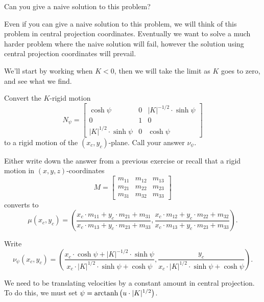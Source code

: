 \documentclass[12pt,noauthor,nooutcomes,handout,newpage]{ximera}
\begin{document}
\begin{problem}
  Can you give a naive solution to this problem?
\end{problem}


Even if you can give a naive solution to this problem, we will think
of this problem in central projection coordinates. Eventually we want
to solve a much harder problem where the naive solution will fail,
however the solution using central projection coordinates will
prevail. 

We'll start by working when $K<0$, then we will take the limit as $K$
goes to zero, and see what we find.

\begin{problem}
  Convert the $K$-rigid motion
  \[
  N_\psi=\begin{bmatrix}
  \cosh\psi & 0 & |K|^{-1/2}\cdot\sinh\psi\\
  0 & 1 & 0\\
  |K|^{1/2}\cdot\sinh\psi & 0 & \cosh\psi
\end{bmatrix}
  \]
  to a rigid motion of the $(x_c,y_c)$-plane. Call your answer $\nu_\psi$.
  \begin{hint}
    Either write down the answer from a previous exercise or recall
    that a rigid motion in $(x,y,z)$-coordinates
    \[
    M=\begin{bmatrix}
    m_{11} & m_{12} & m_{13}\\
    m_{21} & m_{22} & m_{23}\\
    m_{31} & m_{32} & m_{33}
    \end{bmatrix}
    \]
    converts to
    \[
    \mu(x_c,y_c) = \left(
    \frac{x_c\cdot m_{11} + y_c\cdot m_{21} + m_{31}}{x_c\cdot m_{13} + y_c\cdot m_{23} + m_{33}},
    \frac{x_c\cdot m_{12} + y_c\cdot m_{22} + m_{32}}{x_c\cdot m_{13} + y_c\cdot m_{23} + m_{33}}
    \right).
    \]
  \end{hint}
  \begin{freeResponse}
    Write
    \[
    \nu_\psi(x_c,y_c) = \left(\frac{x_c\cdot\cosh\psi+|K|^{-1/2}\cdot\sinh\psi}{x_c\cdot|K|^{1/2}\cdot\sinh\psi+\cosh\psi},\frac{y_c}{x_c\cdot|K|^{1/2}\cdot\sinh\psi+\cosh\psi}\right).
    \]
  \end{freeResponse}
\end{problem}

We need to be translating velocities by a constant amount in central
projection. To do this, we must set $\psi =\operatorname{arctanh}\left(u\cdot|K|^{1/2}\right)$.
\end{document}
